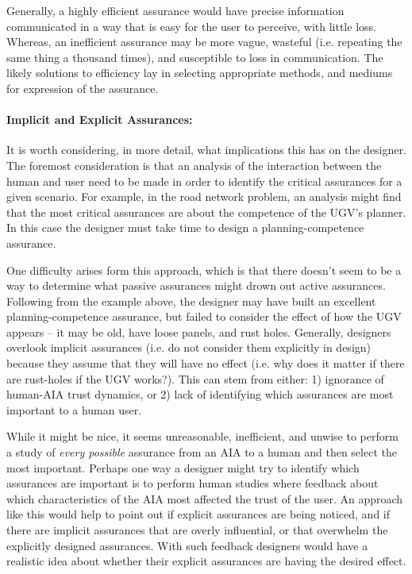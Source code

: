     Generally, a highly efficient assurance would have precise information communicated in a way that is easy for the user to perceive, with little loss. Whereas, an inefficient assurance may be more vague, wasteful (i.e. repeating the same thing a thousand times), and susceptible to loss in communication. The likely solutions to efficiency lay in selecting appropriate methods, and mediums for expression of the assurance.

    \paragraph{Implicit and Explicit Assurances:} It is worth considering, in more detail, what implications this has on the designer. The foremost consideration is that an analysis of the interaction between the human and user need to be made in order to identify the critical assurances for a given scenario. For example, in the road network problem, an analysis might find that the most critical assurances are about the competence of the UGV's planner. In this case the designer must take time to design a planning-competence assurance.

    One difficulty arises form this approach, which is that there doesn't seem to be a way to determine what passive assurances might drown out active assurances. Following from the example above, the designer may have built an excellent planning-competence assurance, but failed to consider the effect of how the UGV appears -- it may be old, have loose panels, and rust holes. Generally, designers overlook implicit assurances (i.e. do not consider them explicitly in design) because they assume that they will have no effect (i.e. why does it matter if there are rust-holes if the UGV works?). This can stem from either: 1) ignorance of human-AIA trust dynamics, or 2) lack of identifying which assurances are most important to a human user.

    While it might be nice, it seems unreasonable, inefficient, and unwise to perform a study of \emph{every possible} assurance from an AIA to a human and then select the most important. Perhaps one way a designer might try to identify which assurances are important is to perform human studies where feedback about which characteristics of the AIA most affected the trust of the user. An approach like this would help to point out if explicit assurances are being noticed, and if there are implicit assurances that are overly influential, or that overwhelm the explicitly designed assurances. With such feedback designers would have a realistic idea about whether their explicit assurances are having the desired effect.

